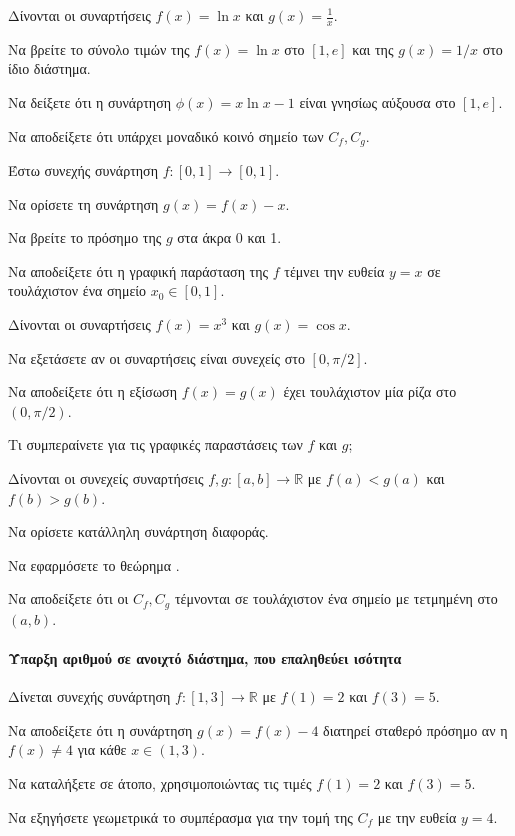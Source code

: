 \documentclass[11pt,a4paper,modern]{FFExercises}
\begin{document}
\askhsh
Δίνονται οι συναρτήσεις $f(x)=\ln x$ και $g(x)=\frac{1}{x}$.
\begin{alist}
    \item Να βρείτε το σύνολο τιμών της $f(x)=\ln x$ στο $[1, e]$ και της $g(x)=1/x$ στο ίδιο διάστημα.
    \item Να δείξετε ότι η συνάρτηση $\phi(x) = x\ln x - 1$ είναι γνησίως αύξουσα στο $[1, e]$.
    \item Να αποδείξετε ότι υπάρχει μοναδικό κοινό σημείο των $C_f, C_g$.
\end{alist}

\askhsh
Έστω συνεχής συνάρτηση $f:[0,1] \to [0,1]$.
\begin{alist}
    \item Να ορίσετε τη συνάρτηση $g(x)=f(x)-x$.
    \item Να βρείτε το πρόσημο της $g$ στα άκρα 0 και 1.
    \item Να αποδείξετε ότι η γραφική παράσταση της $f$ τέμνει την ευθεία $y=x$ σε τουλάχιστον ένα σημείο $x_0 \in [0,1]$.
\end{alist}

\askhsh
Δίνονται οι συναρτήσεις $f(x)=x^3$ και $g(x)=\cos x$.
\begin{alist}
    \item Να εξετάσετε αν οι συναρτήσεις είναι συνεχείς στο $[0, \pi/2]$.
    \item Να αποδείξετε ότι η εξίσωση $f(x)=g(x)$ έχει τουλάχιστον μία ρίζα στο $(0, \pi/2)$.
    \item Τι συμπεραίνετε για τις γραφικές παραστάσεις των $f$ και $g$;
\end{alist}

\askhsh
Δίνονται οι συνεχείς συναρτήσεις $f, g: [a,b] \to \mathbb{R}$ με $f(a)<g(a)$ και $f(b)>g(b)$.
\begin{alist}
    \item Να ορίσετε κατάλληλη συνάρτηση διαφοράς.
    \item Να εφαρμόσετε το θεώρημα .
    \item Να αποδείξετε ότι οι $C_f, C_g$ τέμνονται σε τουλάχιστον ένα σημείο με τετμημένη στο $(a,b)$.
\end{alist}
\paragraph{Ύπαρξη αριθμού σε ανοιχτό διάστημα, που επαληθεύει ισότητα}
\askhsh
Δίνεται συνεχής συνάρτηση $f: [1,3] \to \mathbb{R}$ με $f(1)=2$ και $f(3)=5$.
\begin{alist}
    \item Να αποδείξετε ότι η συνάρτηση $g(x) = f(x) - 4$ διατηρεί σταθερό πρόσημο αν η $f(x) \ne 4$ για κάθε $x \in (1,3)$.
    \item Να καταλήξετε σε άτοπο, χρησιμοποιώντας τις τιμές $f(1)=2$ και $f(3)=5$.
    \item Να εξηγήσετε γεωμετρικά το συμπέρασμα για την τομή της $C_f$ με την ευθεία $y=4$.
\end{alist}
\end{document}
